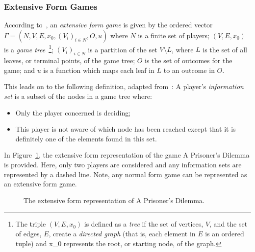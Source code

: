 \subsubsection{Extensive Form Games}\label{subsubsec:Extensive_Form_Games}
According to~\cite{maschler_solan_zamir_2013}, an \textit{extensive form game}
is given by the ordered vector
\(\Gamma = (N, V, E, x_{0}, (V_{i})_{i \in N}, O, u)\)
where \(N\) is a finite set of players; \((V, E, x_{0})\) is a \textit{game
tree}~\footnote{The triple \((V, E, x_{0})\) is defined as a \textit{tree} if
the set of vertices, \(V\), and the set of edges, \(E\), create a
\textit{directed graph} (that is, each element in \(E\) is an ordered tuple) and
x_{0} represents the root, or starting node, of the graph.}; \((V_{i})_{i \in
N}\) is a partition of the set \(V \setminus L\), where \(L\) is the set of all
leaves, or terminal points, of the game tree; \(O\) is the set of outcomes for
the game; and \(u\) is a function which maps each leaf in \(L\) to an outcome 
in \(O\).

This leads on to the following definition, adapted from~\cite{Webb2007}:
\newline
A player's \textit{information set} is a subset of the nodes in a game tree
where:
\begin{itemize}
    \item Only the player concerned is deciding;
    \item This player is not aware of which node has been reached except that it
    is definitely one of the elements found in this set.
\end{itemize} 

In Figure~\ref{fig:PD_game_tree}, the extensive form representation of the
game A Prisoner's Dilemma is provided. Here, only two players are considered and
any information sets are represented by a dashed line. Note, any normal form
game can be represented as an extensive form game. 

\begin{figure}
    \caption{The extensive form representation of A Prisoner's Dilemma.}\label{fig:PD_game_tree}
\end{figure}

